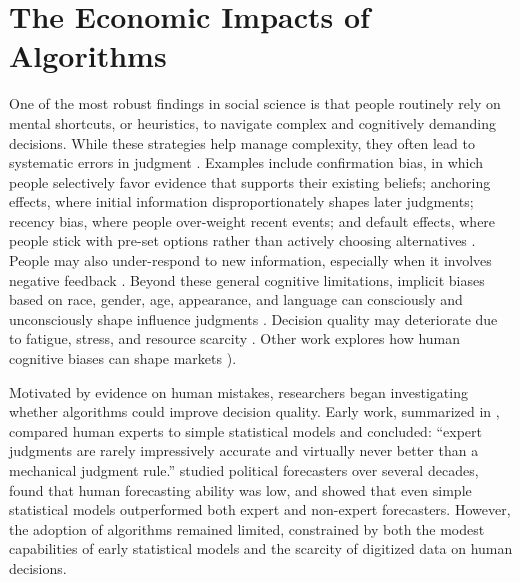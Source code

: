\documentclass[11pt]{article}
\begin{document}
\section{The Economic Impacts of Algorithms}
One of the most robust findings in social science is that people routinely rely on mental shortcuts, or heuristics, to navigate complex and cognitively demanding decisions. While these strategies help manage complexity, they often lead to systematic errors in judgment \citep{tverskykahneman1974, halford_how_2005, shleifernoise}. Examples include confirmation bias, in which people selectively favor evidence that supports their existing beliefs; anchoring effects, where initial information disproportionately shapes later judgments; recency bias, where people over-weight recent events; and default effects, where people stick with pre-set options rather than actively choosing alternatives \citep{wason_failure_1960, ebbinghaus_memory_1913, tverskykahneman1974, Tversky_Kahneman_1982, optimaldefaults2003, thalerSMART2004}. People may also under-respond to new information, especially when it involves negative feedback \citep{mobiusupdating}. Beyond these general cognitive limitations, implicit biases based on race, gender, age, appearance, and language can consciously and unconsciously shape influence judgments \citep{Wistrich2017ImplicitBI, biddlebeauty, mobiusbeauty, DeprezSims2010AccentsIT, goldin2000orchestrating, greenwald_implicit_1995}. Decision quality may deteriorate due to fatigue, stress, and resource scarcity \citep{mani_poverty_2013, Levi2017DecisionFA, kaur_financial_2025}. Other work explores how human cognitive biases can shape markets \citep[e.g.][]{hirshleifer2015survey, shleifernoise, Salzman01012017, mullainathan2012}).  

Motivated by evidence on human mistakes, researchers began investigating whether algorithms could improve decision quality. Early work, summarized in \citet{dawesbook2001}, compared human experts to simple statistical models and concluded: ``expert judgments are rarely impressively accurate and virtually never better than a mechanical judgment rule.'' \citet{tetlock_expert_2005} studied political forecasters over several decades, found that human forecasting ability was low, and showed that even simple statistical models outperformed both expert and non-expert forecasters. However, the adoption of algorithms remained limited, constrained by both the modest capabilities of early statistical models and the scarcity of digitized data on human decisions.
\end{document}
